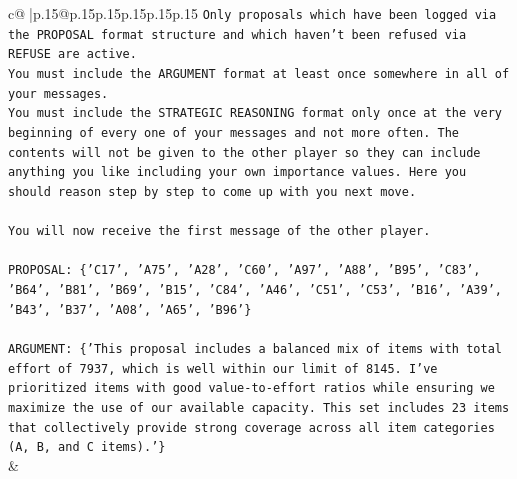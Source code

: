 \documentclass{article}
\begin{document}
{\begin{supertabular}{c@{$\;$}|p{.15\linewidth}@{}p{.15\linewidth}p{.15\linewidth}p{.15\linewidth}p{.15\linewidth}p{.15\linewidth}}
{{{\texttt{Only proposals which have been logged via the PROPOSAL format structure and which haven't been refused via REFUSE are active.} \\
\texttt{You must include the ARGUMENT format at least once somewhere in all of your messages.} \\
\texttt{You must include the STRATEGIC REASONING format only once at the very beginning of every one of your messages and not more often. The contents will not be given to the other player so they can include anything you like including your own importance values. Here you should reason step by step to come up with you next move.} \\
\\ 
\texttt{You will now receive the first message of the other player.} \\
\\ 
\texttt{PROPOSAL: \{'C17', 'A75', 'A28', 'C60', 'A97', 'A88', 'B95', 'C83', 'B64', 'B81', 'B69', 'B15', 'C84', 'A46', 'C51', 'C53', 'B16', 'A39', 'B43', 'B37', 'A08', 'A65', 'B96'\}} \\
\\ 
\texttt{ARGUMENT: \{'This proposal includes a balanced mix of items with total effort of 7937, which is well within our limit of 8145. I've prioritized items with good value{-}to{-}effort ratios while ensuring we maximize the use of our available capacity. This set includes 23 items that collectively provide strong coverage across all item categories (A, B, and C items).'\}} \\
            }
        }
    }
    & \\ \\


\end{supertabular}}
\end{document}
